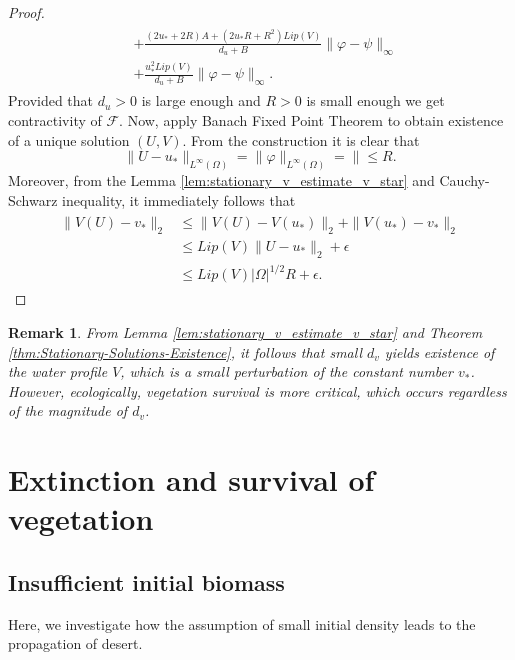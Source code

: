 \documentclass[12pt, a4paper]{article}
\theoremstyle{break}
\theoremstyle{break}
\theoremstyle{break}
\theoremstyle{break}
\newtheorem{rem}{Remark}[section]
\theoremstyle{break}
\theoremstyle{break}
\theoremstyle{break}
\begin{document}
\begin{proof}
\begin{align}
\begin{split}
            &+
            \frac{(2u_* + 2R) A + (2u_*R + R^2) Lip(V)}{d_u + B} \|\varphi - \psi\|_\infty \\
            &+ \frac{u_*^2Lip(V)}{d_u + B}\|\varphi - \psi\|_\infty.
        \end{split}
    \end{align}
    Provided that $d_u > 0$ is large enough and $R > 0$ is small enough we get contractivity of $\mathcal{F}$. Now, apply Banach Fixed Point Theorem to obtain existence of a unique solution $(U, V)$. From the construction it is clear that 
    \begin{equation}
        \|U - u_*\|_{L^\infty(\Omega)} = \|\varphi\|_{L^\infty(\Omega)} = \| \leq R.
    \end{equation}
    Moreover, from the Lemma \ref{lem:stationary_v_estimate_v_star} and Cauchy-Schwarz inequality, it immediately follows that
    \begin{align}
        \begin{split}
            \|V(U) - v_*\|_2 
            &\leq \|V(U) - V(u_*)\|_2 + \|V(u_*) - v_*\|_2 \\
            &\leq Lip(V)\|U-u_*\|_2 + \epsilon \\
            &\leq Lip(V)|\Omega|^{1/2} R + \epsilon.     
        \end{split}
    \end{align}
\end{proof}

\begin{rem}
    From Lemma \ref{lem:stationary_v_estimate_v_star} and Theorem \ref{thm:Stationary-Solutions-Existence}, it follows that small $d_v$ yields existence of the water profile $V$, which is a small perturbation of the constant number $v_*$. However, ecologically, vegetation survival is more critical, which occurs regardless of the magnitude of $d_v$. 
\end{rem}

\section{Extinction and survival of vegetation}

\subsection{Insufficient initial biomass} Here, we investigate how the assumption of small initial density leads to the propagation of desert.
\end{document}
